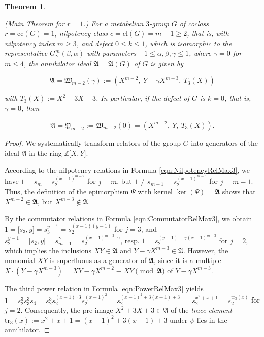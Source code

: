 \documentclass{amsart}
\newtheorem{theorem}{Theorem}[section]
\theoremstyle{definition}
\numberwithin{equation}{section}
\begin{document}
\begin{theorem}
\label{thm:SmbOrdMax3}

(Main Theorem for \(r=1\).)
For a metabelian \(3\)-group \(G\) of coclass \(r=\mathrm{cc}(G)=1\), nilpotency class \(c=\mathrm{cl}(G)=m-1\ge 2\),
that is, with nilpotency index \(m\ge 3\), and defect \(0\le k\le 1\),
which is isomorphic to the representative \(G_\gamma^m(\beta,\alpha)\) with parameters \(-1\le\alpha,\beta,\gamma\le 1\),
where \(\gamma=0\) for \(m\le 4\), the annihilator ideal \(\mathfrak{A}=\mathfrak{A}(G)\) of \(G\) is given by

\begin{equation}
\label{eqn:SmbOrdMax3WithDef}
\mathfrak{A}=\mathfrak{W}_{m-2}(\gamma):=\left(X^{m-2},\ Y-\gamma X^{m-3},\ T_3(X)\right)
\end{equation}

\noindent
with \(T_3(X):=X^2+3X+3\). In particular, if the defect of \(G\) is \(k=0\), that is, \(\gamma=0\), then

\begin{equation}
\label{eqn:SmbOrdMax3}
\mathfrak{A}=\mathfrak{Y}_{m-2}:=\mathfrak{W}_{m-2}(0)=\left(X^{m-2},\ Y,\ T_3(X)\right).
\end{equation}

\end{theorem}

\begin{proof}
We systematically transform relators of the group \(G\)
into generators of the ideal \(\mathfrak{A}\) in the ring \(\mathbb{Z}\lbrack X,Y\rbrack\).

According to the nilpotency relations in Formula
\eqref{eqn:NilpotencyRelMax3},
we have
\(1=s_m=s_2^{(x-1)^{m-2}}\) for \(j=m\),
but
\(1\ne s_{m-1}=s_2^{(x-1)^{m-3}}\) for \(j=m-1\).
Thus, the definition of the epimorphism \(\Psi\) with kernel \(\ker(\Psi)=\mathfrak{A}\) shows that
\(X^{m-2}\in\mathfrak{A}\), but \(X^{m-3}\notin\mathfrak{A}\).

By the commutator relations in Formula
\eqref{eqn:CommutatorRelMax3},
we obtain
\(1=\lbrack s_3,y\rbrack=s_3^{y-1}=s_2^{(x-1)(y-1)}\) for \(j=3\),
and \(s_2^{y-1}=\lbrack s_2,y\rbrack=s_{m-1}^\gamma=s_2^{(x-1)^{m-3}\cdot\gamma}\),
resp. \(1=s_2^{(y-1)-\gamma(x-1)^{m-3}}\) for \(j=2\),
which implies the inclusions
\(XY\in\mathfrak{A}\) and \(Y-\gamma X^{m-3}\in\mathfrak{A}\).
However, the monomial \(XY\) is superfluous as a generator of \(\mathfrak{A}\),
since it is a multiple
\(X\cdot\left(Y-\gamma X^{m-3}\right)=XY-\gamma X^{m-2}\equiv XY\pmod{\mathfrak{A}}\)
of \(Y-\gamma X^{m-3}\).

The third power relation in Formula
\eqref{eqn:PowerRelMax3}
yields
\(1=s_2^3s_3^3s_4=s_2^3s_2^{(x-1)\cdot 3}s_2^{(x-1)^2}=s_2^{(x-1)^2+3(x-1)+3}\)
\(=s_2^{x^2+x+1}=s_2^{\mathrm{tr}_3(x)}\) for \(j=2\).
Consequently, the pre-image \(X^2+3X+3\in\mathfrak{A}\) of the \textit{trace element}
\(\mathrm{tr}_3(x):=x^2+x+1=(x-1)^2+3(x-1)+3\)
under \(\psi\) lies in the annihilator.
\end{proof}
\end{document}
